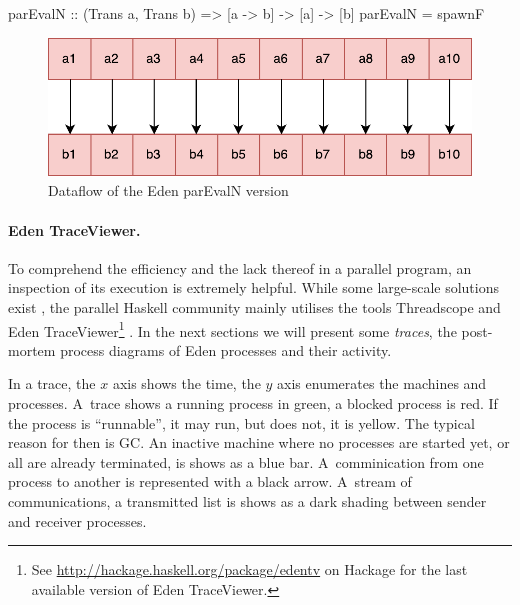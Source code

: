 \begin{code}
parEvalN :: (Trans a, Trans b) => [a -> b] -> [a] -> [b]
parEvalN = spawnF 
\end{code}
\begin{figure}[h]
	\includegraphics[scale=0.5]{images/parEvalNEden}
	\caption{Dataflow of the Eden parEvalN version}
\end{figure}

\paragraph{Eden TraceViewer.}
To comprehend the efficiency and the lack thereof in a parallel program, an inspection of its execution is extremely helpful. While some large-scale solutions exist \cite{Geimer2010}, the parallel Haskell community mainly utilises the tools Threadscope \cite{Wheeler2009} and Eden TraceViewer\footnote{See \url{http://hackage.haskell.org/package/edentv} on Hackage for the last available version of Eden TraceViewer.} \cite{Berthold2007a}. In the next sections we will present some \emph{traces}, the post-mortem process diagrams of Eden processes and their activity.

In a trace, the $x$ axis shows the time, the $y$ axis enumerates the machines and processes. A~trace shows a running process in green, a blocked process is red. If the process is \enquote{runnable}, \ie it may run, but does not, it is yellow. The typical reason for then is GC. An inactive machine where no processes are started yet, or all are already terminated, is shows as a blue bar. A~comminication from one process to another is represented with a black arrow. A~stream of communications, \eg a transmitted list is shows as a dark shading between sender and receiver processes.



